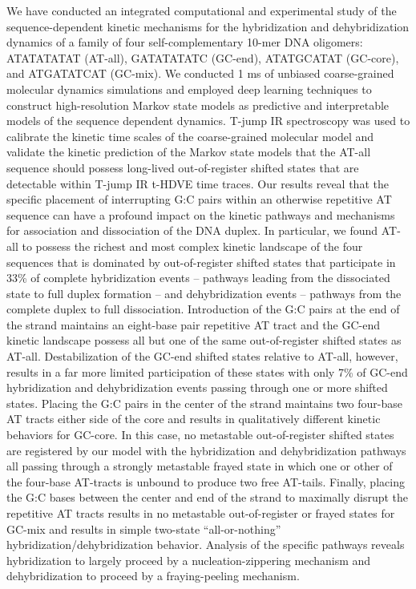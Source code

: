 \documentclass[journal=jpcbfk,manuscript=article]{achemso}
\begin{document}
We have conducted an integrated computational and experimental study of the sequence-dependent kinetic mechanisms for the hybridization and dehybridization dynamics of a family of four self-complementary 10-mer DNA oligomers: ATATATATAT (AT-all), GATATATATC (GC-end), ATATGCATAT (GC-core), and ATGATATCAT (GC-mix). We conducted 1 ms of unbiased coarse-grained molecular dynamics simulations and employed deep learning techniques to construct high-resolution Markov state models as predictive and interpretable models of the sequence dependent dynamics. T-jump IR spectroscopy was used to calibrate the kinetic time scales of the coarse-grained molecular model and validate the kinetic prediction of the Markov state models that the AT-all sequence should possess long-lived out-of-register shifted states that are detectable within T-jump IR t-HDVE time traces. Our results reveal that the specific placement of interrupting G:C pairs within an otherwise repetitive AT sequence can have a profound impact on the kinetic pathways and mechanisms for association and dissociation of the DNA duplex. In particular, we found AT-all to possess the richest and most complex kinetic landscape of the four sequences that is dominated by out-of-register shifted states that participate in 33\% of complete hybridization events -- pathways leading from the dissociated state to full duplex formation -- and dehybridization events -- pathways from the complete duplex to full dissociation. Introduction of the G:C pairs at the end of the strand maintains an eight-base pair repetitive AT tract and the GC-end kinetic landscape possess all but one of the same out-of-register shifted states as AT-all. Destabilization of the GC-end shifted states relative to AT-all, however, results in a far more limited participation of these states with only 7\% of GC-end hybridization and dehybridization events passing through one or more shifted states. Placing the G:C pairs in the center of the strand maintains two four-base AT tracts either side of the core and results in qualitatively different kinetic behaviors for GC-core. In this case, no metastable out-of-register shifted states are registered by our model with the hybridization and dehybridization pathways all passing through a strongly metastable frayed state in which one or other of the four-base AT-tracts is unbound to produce two free AT-tails. Finally, placing the G:C bases between the center and end of the strand to maximally disrupt the repetitive AT tracts results in no metastable out-of-register or frayed states for GC-mix and results in simple two-state ``all-or-nothing'' hybridization/dehybridization behavior. Analysis of the specific pathways reveals hybridization to largely proceed by a nucleation-zippering mechanism and dehybridization to proceed by a fraying-peeling mechanism. 
\end{document}
